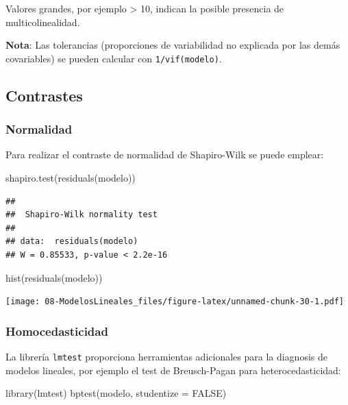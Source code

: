 \documentclass[
]{book}
\newenvironment{Shaded}{\begin{snugshade}}{\end{snugshade}}
\newcommand{\AttributeTok}[1]{\textcolor[rgb]{0.77,0.63,0.00}{#1}}
\newcommand{\ConstantTok}[1]{\textcolor[rgb]{0.00,0.00,0.00}{#1}}
\newcommand{\FunctionTok}[1]{\textcolor[rgb]{0.00,0.00,0.00}{#1}}
\newcommand{\NormalTok}[1]{#1}
\theoremstyle{break}
\theoremstyle{nonumberplain}
\begin{document}
Valores grandes, por ejemplo \textgreater{} 10, indican la posible presencia de multicolinealidad.

\textbf{Nota}: Las tolerancias (proporciones de variabilidad no explicada por las demás covariables) se pueden calcular con \texttt{1/vif(modelo)}.

\hypertarget{contrastes-1}{%
\subsection{Contrastes}\label{contrastes-1}}

\hypertarget{normalidad-1}{%
\subsubsection{Normalidad}\label{normalidad-1}}

Para realizar el contraste de normalidad de Shapiro-Wilk se puede emplear:

\begin{Shaded}
\begin{Highlighting}[]
\FunctionTok{shapiro.test}\NormalTok{(}\FunctionTok{residuals}\NormalTok{(modelo))}
\end{Highlighting}
\end{Shaded}

\begin{verbatim}
## 
##  Shapiro-Wilk normality test
## 
## data:  residuals(modelo)
## W = 0.85533, p-value < 2.2e-16
\end{verbatim}

\begin{Shaded}
\begin{Highlighting}[]
\FunctionTok{hist}\NormalTok{(}\FunctionTok{residuals}\NormalTok{(modelo))}
\end{Highlighting}
\end{Shaded}

\texttt{[image: 08-ModelosLineales\_files/figure-latex/unnamed-chunk-30-1.pdf]}

\hypertarget{homocedasticidad}{%
\subsubsection{Homocedasticidad}\label{homocedasticidad}}

La librería \texttt{lmtest} proporciona herramientas adicionales para la diagnosis de modelos lineales, por ejemplo el test de Breusch-Pagan para heterocedasticidad:

\begin{Shaded}
\begin{Highlighting}[]
\FunctionTok{library}\NormalTok{(lmtest)}
\FunctionTok{bptest}\NormalTok{(modelo, }\AttributeTok{studentize =} \ConstantTok{FALSE}\NormalTok{)}
\end{Highlighting}
\end{Shaded}
\end{document}
